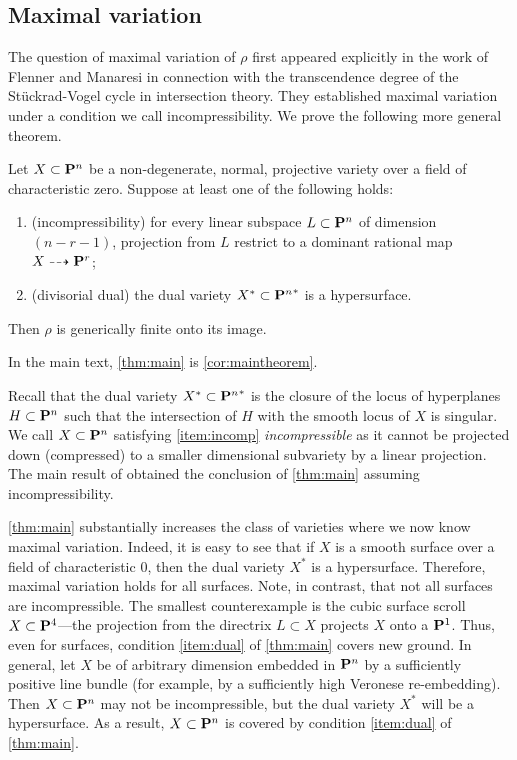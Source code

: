 \documentclass[11pt,reqno]{amsart}
\theoremstyle{plain}
\theoremstyle{definition}
\theoremstyle{remark}
\numberwithin{equation}{section}
\numberwithin{equation}{section}
\begin{document}
\subsection{Maximal variation}
The question of maximal variation of $\rho$ first appeared explicitly in the work of Flenner and Manaresi \cite{fle.man:98} in connection with the transcendence degree of the St\"uckrad-Vogel cycle in intersection theory. 
They established maximal variation under a condition we call incompressibility.
We prove the following more general theorem.
\begin{maintheorem}\label{thm:main}
  Let $X \subset \P^n$ be a non-degenerate, normal, projective variety over a field of characteristic zero.
  Suppose at least one of the following holds:
  \begin{enumerate}
  \item\label{item:incomp}(incompressibility) for every linear subspace $L \subset \P^n$ of dimension $(n-r-1)$, projection from $L$ restrict to a dominant rational map $X \dashrightarrow \P^r$;
  \item\label{item:dual}(divisorial dual) the dual variety $X^* \subset {\P^n}^*$ is a hypersurface.
  \end{enumerate}
  Then $\rho$ is generically finite onto its image.
\end{maintheorem}
In the main text, \autoref{thm:main} is \autoref{cor:maintheorem}.

Recall that the dual variety $X^* \subset {\P^n}^*$ is the closure of the locus of hyperplanes $H \subset \P^n$ such that the intersection of $H$ with the smooth locus of $X$ is singular.
We call $X \subset \P^n$ satisfying \eqref{item:incomp} \emph{incompressible} as it cannot be projected down (compressed) to a smaller dimensional subvariety by a linear projection.
The main result of \cite{fle.man:98} obtained the conclusion of \autoref{thm:main} assuming incompressibility.

\autoref{thm:main} substantially increases the class of varieties where we now know maximal variation.
Indeed, it is easy to see that if $X$ is a smooth surface over a field of characteristic $0$, then the dual variety $X^*$ is a hypersurface.
Therefore, maximal variation holds for all surfaces.
Note, in contrast, that not all surfaces are incompressible.
The smallest counterexample is the cubic surface scroll $X \subset \P^4$---the projection from the directrix $L \subset X$ projects $X$ onto a $\P^1$.
Thus, even for surfaces, condition \eqref{item:dual} of \autoref{thm:main} covers new ground.
In general, let $X$ be of arbitrary dimension embedded in $\P^n$ by a sufficiently positive line bundle (for example, by a sufficiently high Veronese re-embedding).
Then $X \subset \P^n$ may not be incompressible, but the dual variety $X^*$ will be a hypersurface.
As a result, $X \subset \P^n$ is covered by condition \eqref{item:dual} of \autoref{thm:main}.
\end{document}
